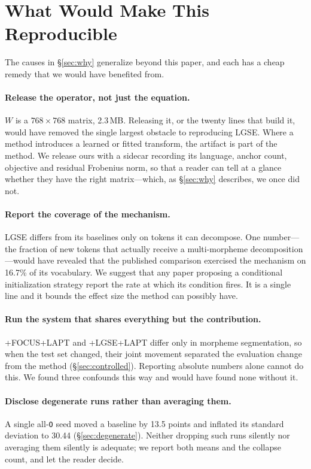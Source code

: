 \documentclass[11pt]{article}
\begin{document}
\section{What Would Make This Reproducible}
\label{sec:recs}

The causes in \S\ref{sec:why} generalize beyond this paper, and each has a
cheap remedy that we would have benefited from.

\paragraph{Release the operator, not just the equation.} $W$ is a $768
\times 768$ matrix, 2.3\,MB. Releasing it, or the twenty lines that build it,
would have removed the single largest obstacle to reproducing LGSE. Where a
method introduces a learned or fitted transform, the artifact is part of the
method. We release ours with a sidecar recording its language, anchor count,
objective and residual Frobenius norm, so that a reader can tell at a glance
whether they have the right matrix---which, as \S\ref{sec:why} describes, we
once did not.

\paragraph{Report the coverage of the mechanism.} LGSE differs from its
baselines only on tokens it can decompose. One number---the fraction of new
tokens that actually receive a multi-morpheme decomposition---would have
revealed that the published comparison exercised the mechanism on 16.7\% of
its vocabulary. We suggest that any paper proposing a conditional
initialization strategy report the rate at which its condition fires. It is a
single line and it bounds the effect size the method can possibly have.

\paragraph{Run the system that shares everything but the contribution.}
\textsc{+FOCUS+LAPT} and \textsc{+LGSE+LAPT} differ only in morpheme
segmentation, so when the test set changed, their joint movement separated the
evaluation change from the method
(\S\ref{sec:controlled}). Reporting absolute numbers
alone cannot do this. We found three confounds this way and would have found
none without it.

\paragraph{Disclose degenerate runs rather than averaging them.} A single
all-\texttt{O} seed moved a baseline by 13.5 points and inflated its standard
deviation to 30.44 (\S\ref{sec:degenerate}). Neither dropping such runs
silently nor averaging them silently is adequate; we report both means and
the collapse count, and let the reader decide.
\end{document}
